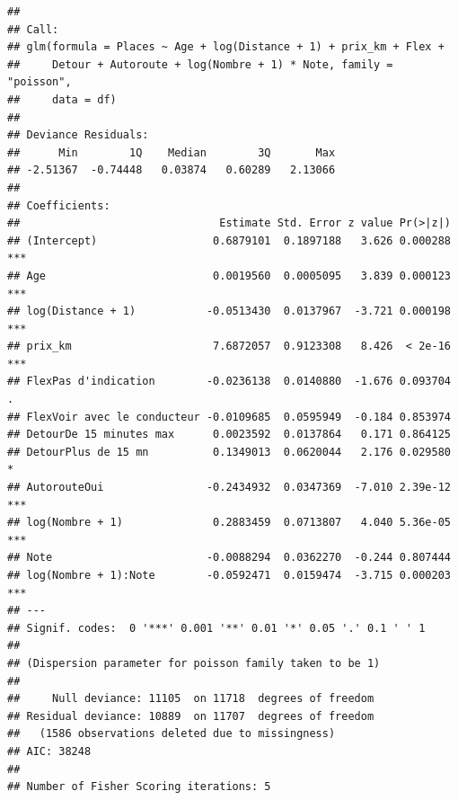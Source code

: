 \documentclass[
]{book}
\newenvironment{Shaded}{\begin{snugshade}}{\end{snugshade}}
\newcommand{\AttributeTok}[1]{\textcolor[rgb]{0.77,0.63,0.00}{#1}}
\newcommand{\DecValTok}[1]{\textcolor[rgb]{0.00,0.00,0.81}{#1}}
\newcommand{\FunctionTok}[1]{\textcolor[rgb]{0.00,0.00,0.00}{#1}}
\newcommand{\NormalTok}[1]{#1}
\newcommand{\OtherTok}[1]{\textcolor[rgb]{0.56,0.35,0.01}{#1}}
\newcommand{\SpecialCharTok}[1]{\textcolor[rgb]{0.00,0.00,0.00}{#1}}
\newcommand{\StringTok}[1]{\textcolor[rgb]{0.31,0.60,0.02}{#1}}
\begin{document}
\begin{Shaded}
\end{Shaded}

\begin{verbatim}
## 
## Call:
## glm(formula = Places ~ Age + log(Distance + 1) + prix_km + Flex + 
##     Detour + Autoroute + log(Nombre + 1) * Note, family = "poisson", 
##     data = df)
## 
## Deviance Residuals: 
##      Min        1Q    Median        3Q       Max  
## -2.51367  -0.74448   0.03874   0.60289   2.13066  
## 
## Coefficients:
##                               Estimate Std. Error z value Pr(>|z|)    
## (Intercept)                  0.6879101  0.1897188   3.626 0.000288 ***
## Age                          0.0019560  0.0005095   3.839 0.000123 ***
## log(Distance + 1)           -0.0513430  0.0137967  -3.721 0.000198 ***
## prix_km                      7.6872057  0.9123308   8.426  < 2e-16 ***
## FlexPas d'indication        -0.0236138  0.0140880  -1.676 0.093704 .  
## FlexVoir avec le conducteur -0.0109685  0.0595949  -0.184 0.853974    
## DetourDe 15 minutes max      0.0023592  0.0137864   0.171 0.864125    
## DetourPlus de 15 mn          0.1349013  0.0620044   2.176 0.029580 *  
## AutorouteOui                -0.2434932  0.0347369  -7.010 2.39e-12 ***
## log(Nombre + 1)              0.2883459  0.0713807   4.040 5.36e-05 ***
## Note                        -0.0088294  0.0362270  -0.244 0.807444    
## log(Nombre + 1):Note        -0.0592471  0.0159474  -3.715 0.000203 ***
## ---
## Signif. codes:  0 '***' 0.001 '**' 0.01 '*' 0.05 '.' 0.1 ' ' 1
## 
## (Dispersion parameter for poisson family taken to be 1)
## 
##     Null deviance: 11105  on 11718  degrees of freedom
## Residual deviance: 10889  on 11707  degrees of freedom
##   (1586 observations deleted due to missingness)
## AIC: 38248
## 
## Number of Fisher Scoring iterations: 5
\end{verbatim}
\end{document}
